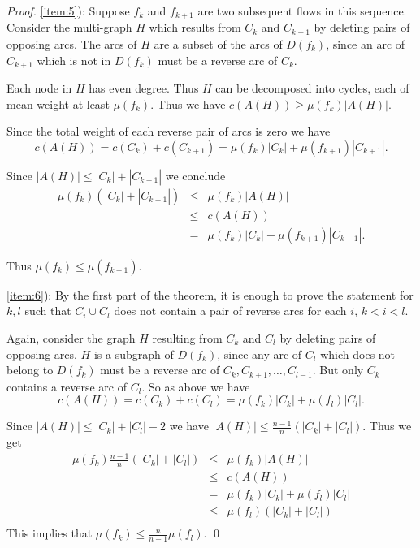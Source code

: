   \begin{proof}
    
    \ref{item:5}): Suppose $f_k$ and $f_{k+1}$ are two subsequent flows in this
    sequence. Consider the multi-graph $H$ which results from $C_k$
    and $C_{k+1}$ by deleting pairs of opposing arcs.  The arcs of
    $H$ are a subset of the arcs of $D(f_k)$, since an arc of
    $C_{k+1}$ which is not in $D(f_k)$ must be a reverse arc of $C_k$.

    Each node in $H$ has even degree.  Thus $H$ can be
    decomposed into cycles, each of mean weight at least $ \mu(f_k)$.  
    Thus we have $c(A(H)) \geq \mu(f_k) |A(H)|$. 

    Since the total weight of each reverse pair of arcs is zero we
    have 
    \begin{displaymath}
      c(A(H)) = c(C_k) + c(C_{k+1}) = \mu(f_k) |C_k|   + \mu(f_{k+1}) |C_{k+1}|.
    \end{displaymath}

    Since $|A(H)| \leq |C_k| + |C_{k+1}|$ we conclude 
    \begin{eqnarray*}
       \mu(f_k) ( |C_k| + |C_{k+1}|) & \leq &  \mu(f_k)|A(H)| \\
                              & \leq & c(A(H)) \\
                              & = & \mu(f_k) |C_k|   + \mu(f_{k+1}) |C_{k+1}|.
    \end{eqnarray*}

    Thus $\mu(f_k) \leq \mu(f_{k+1})$. 

    
    \ref{item:6}): By the first part of the theorem, it is enough to
    prove the statement for $k,l$ such that $C_i \cup C_l$ does not
    contain a pair of reverse arcs for each  $ i, \, k < i < l$.  

    Again, consider the graph $H$ resulting from  $C_k$
    and $C_{l}$ by deleting pairs of opposing arcs. $H$ is a subgraph
    of $D(f_k)$, since any arc of $C_l$ which does not belong to
    $D(f_k)$ must be a reverse arc of $C_k,C_{k+1},\ldots,C_{l-1}$. But
    only $C_k$ contains a reverse arc of $C_l$. So as above we have 
    \begin{displaymath}
      c(A(H)) = c(C_k) + c(C_{l}) = \mu(f_k) |C_k|   + \mu(f_{l})      |C_{l}|. 
    \end{displaymath}
    
    Since $|A(H)| \leq |C_k| + |C_{l}| -2$ we have $|A(H)| \leq
    \frac{n-1}{n}( |C_k| + |C_{l}|)$. Thus we get
    \begin{eqnarray*}
       \mu(f_k)\frac{n-1}{n} ( |C_k| + |C_{l}|) & \leq &  \mu(f_k)|A(H)| \\
                              & \leq & c(A(H)) \\
                              & = & \mu(f_k) |C_k|   + \mu(f_{l})|C_{l}|\\          
                              & \leq & \mu(f_{l}) (|C_k|   + |C_{l}|) \\                       
    \end{eqnarray*}
    This implies that $\mu(f_k) \leq \frac{n}{n-1}  \mu(f_l)$.  
    \qed
  \end{proof}







